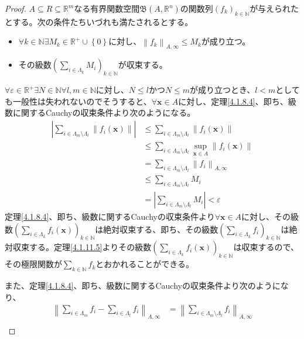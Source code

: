 \documentclass[dvipdfmx]{jsarticle}
\begin{document}
\begin{proof}
$A \subseteq R \subseteq \mathbb{R}^{m}$なる有界関数空間$\mathfrak{B}\left( A,\mathbb{R}^{n} \right)$の関数列$\left( f_{k} \right)_{k \in \mathbb{N}}$が与えられたとする。次の条件たちいづれも満たされるとする。
\begin{itemize}
\item
  $\forall k \in \mathbb{N}\exists M_{k} \in \mathbb{R}^{+} \cup \left\{ 0 \right\}$に対し、$\left\| f_{k} \right\|_{A,\infty} \leq M_{k}$が成り立つ。
\item
  その級数$\left( \sum_{i \in \varLambda_{k}} M_{i} \right)_{k \in \mathbb{N}}$が収束する。
\end{itemize}
$\forall\varepsilon \in \mathbb{R}^{+}\exists N \in \mathbb{N}\forall l,m \in \mathbb{N}$に対し、$N \leq l$かつ$N \leq m$が成り立つとき、$l < m$としても一般性は失われないのでそうすると、$\forall\mathbf{x} \in A$に対し、定理\ref{4.1.8.4}、即ち、級数に関するCauchyの収束条件より次のようになる。
\begin{align*}
\left| \sum_{i \in \varLambda_{m} \setminus \varLambda_{l}} \left\| f_{i}\left( \mathbf{x} \right) \right\| \right| &\leq \sum_{i \in \varLambda_{m} \setminus \varLambda_{l}} \left\| f_{i}\left( \mathbf{x} \right) \right\|\\
&\leq \sum_{i \in \varLambda_{m} \setminus \varLambda_{l}} {\sup_{\mathbf{x} \in A}\left\| f_{i}\left( \mathbf{x} \right) \right\|}\\
&= \sum_{i \in \varLambda_{m} \setminus \varLambda_{l}} \left\| f_{i} \right\|_{A,\infty}\\
&\leq \sum_{i \in \varLambda_{m} \setminus \varLambda_{l}} M_{i}\\
&= \left| \sum_{i \in \varLambda_{m} \setminus \varLambda_{l}} M_{i} \right| < \varepsilon
\end{align*}
定理\ref{4.1.8.4}、即ち、級数に関するCauchyの収束条件より$\forall\mathbf{x} \in A$に対し、その級数$\left( \sum_{i \in \varLambda_{k}} {f_{i}\left( \mathbf{x} \right)} \right)_{k \in \mathbb{N}}$は絶対収束する、即ち、その級数$\left( \sum_{i \in \varLambda_{k}} f_{i} \right)_{k \in \mathbb{N}}$は絶対収束する。定理\ref{4.1.11.5}よりその級数$\left( \sum_{i \in \varLambda_{k}} {f_{i}\left( \mathbf{x} \right)} \right)_{k \in \mathbb{N}}$は収束するので、その極限関数が$\sum_{k \in \mathbb{N}} f_{k}$とおかれることができる。\par
また、定理\ref{4.1.8.4}、即ち、級数に関するCauchyの収束条件より次のようになり、
\begin{align*}
\left\| \sum_{i \in \varLambda_{m}} f_{i} - \sum_{i \in \varLambda_{l}} f_{i} \right\|_{A,\infty} &= \left\| \sum_{i \in \varLambda_{m} \setminus \varLambda_{l}} f_{i} \right\|_{A,\infty}\\

\end{align*}
\end{proof}
\end{document}
